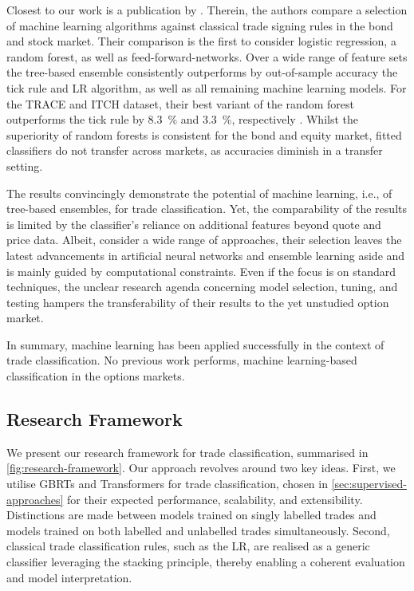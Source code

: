 Closest to our work is a publication by \textcite[1--58]{ronenMachineLearningTrade2022}. Therein, the authors compare a selection of machine learning algorithms against classical trade signing rules in the bond and stock market. Their comparison is the first to consider logistic regression, a random forest, as well as \glspl{feed-forward-network}. Over a wide range of feature sets the tree-based ensemble consistently outperforms by out-of-sample accuracy the tick rule and \gls{LR} algorithm, as well as all remaining machine learning models. For the \gls{TRACE} and ITCH dataset, their best variant of the random forest outperforms the tick rule by \SI{8.3}{\percent} and \SI{3.3}{\percent}, respectively \autocite[57]{ronenMachineLearningTrade2022}. Whilst the superiority of random forests is consistent for the bond and equity market, fitted classifiers do not transfer across markets, as accuracies diminish in a transfer setting.

The results convincingly demonstrate the potential of machine learning, i.e., of tree-based ensembles, for trade classification. Yet, the comparability of the results is limited by the classifier's reliance on additional features beyond quote and price data. Albeit, \textcite[13--14]{ronenMachineLearningTrade2022} consider a wide range of approaches, their selection leaves the latest advancements in artificial neural networks and ensemble learning aside and is mainly guided by computational constraints. Even if the focus is on standard techniques, the unclear research agenda concerning model selection, tuning, and testing hampers the transferability of their results to the yet unstudied option market.

In summary, machine learning has been applied successfully in the context of trade classification. No previous work performs, machine learning-based classification in the options markets.


\newpage

\subsection{Research Framework}\label{sec:research-framework}

We present our research framework for trade classification, summarised in \cref{fig:research-framework}. Our approach revolves around two key ideas. First, we utilise \glspl{GBRT} and Transformers for trade classification, chosen in \cref{sec:supervised-approaches} for their expected performance, scalability, and extensibility. Distinctions are made between models trained on singly labelled trades and models trained on both labelled and unlabelled trades simultaneously. Second, classical trade classification rules, such as the \gls{LR}, are realised as a generic classifier leveraging the stacking principle, thereby enabling a coherent evaluation and model interpretation.

